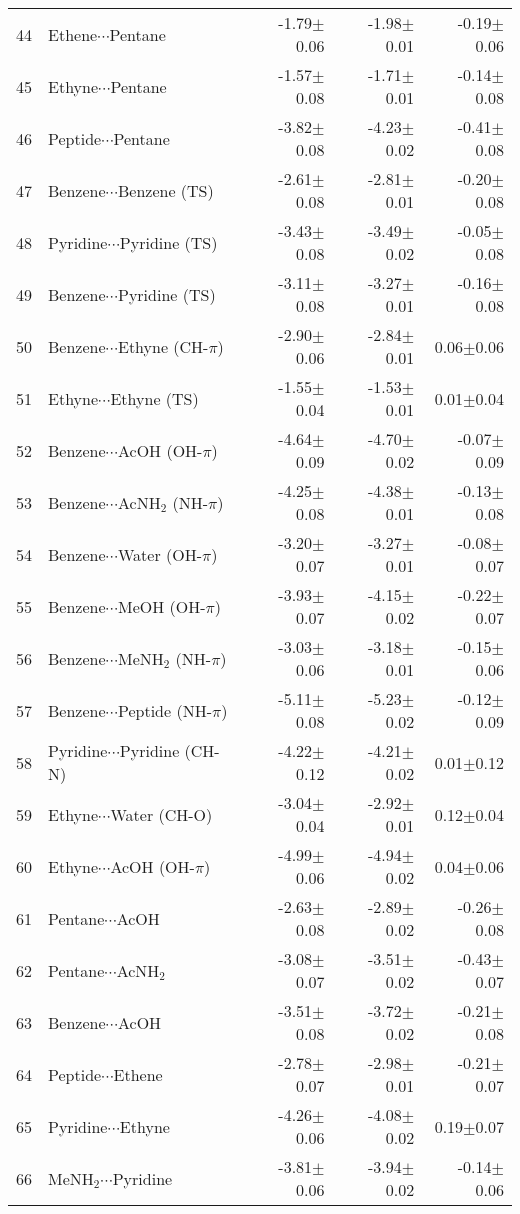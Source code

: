 \begin{longtable}{llrrr}
44 & Ethene$\cdots$Pentane & -1.79$\pm$0.06 & -1.98$\pm$0.01 & -0.19$\pm$0.06  \\
45 & Ethyne$\cdots$Pentane & -1.57$\pm$0.08 & -1.71$\pm$0.01 & -0.14$\pm$0.08  \\
46 & Peptide$\cdots$Pentane & -3.82$\pm$0.08 & -4.23$\pm$0.02 & -0.41$\pm$0.08  \\
47 & Benzene$\cdots$Benzene (TS) & -2.61$\pm$0.08 & -2.81$\pm$0.01 & -0.20$\pm$0.08  \\
48 & Pyridine$\cdots$Pyridine (TS) & -3.43$\pm$0.08 & -3.49$\pm$0.02 & -0.05$\pm$0.08  \\
49 & Benzene$\cdots$Pyridine (TS) & -3.11$\pm$0.08 & -3.27$\pm$0.01 & -0.16$\pm$0.08  \\
50 & Benzene$\cdots$Ethyne (CH-$\pi$) & -2.90$\pm$0.06 & -2.84$\pm$0.01 & 0.06$\pm$0.06  \\
51 & Ethyne$\cdots$Ethyne (TS) & -1.55$\pm$0.04 & -1.53$\pm$0.01 & 0.01$\pm$0.04  \\
52 & Benzene$\cdots$AcOH (OH-$\pi$) & -4.64$\pm$0.09 & -4.70$\pm$0.02 & -0.07$\pm$0.09  \\
53 & Benzene$\cdots$AcNH$_2$ (NH-$\pi$) & -4.25$\pm$0.08 & -4.38$\pm$0.01 & -0.13$\pm$0.08  \\
54 & Benzene$\cdots$Water (OH-$\pi$) & -3.20$\pm$0.07 & -3.27$\pm$0.01 & -0.08$\pm$0.07  \\
55 & Benzene$\cdots$MeOH (OH-$\pi$) & -3.93$\pm$0.07 & -4.15$\pm$0.02 & -0.22$\pm$0.07  \\
56 & Benzene$\cdots$MeNH$_2$ (NH-$\pi$) & -3.03$\pm$0.06 & -3.18$\pm$0.01 & -0.15$\pm$0.06  \\
57 & Benzene$\cdots$Peptide (NH-$\pi$) & -5.11$\pm$0.08 & -5.23$\pm$0.02 & -0.12$\pm$0.09  \\
58 & Pyridine$\cdots$Pyridine (CH-N) & -4.22$\pm$0.12 & -4.21$\pm$0.02 & 0.01$\pm$0.12  \\
59 & Ethyne$\cdots$Water (CH-O) & -3.04$\pm$0.04 & -2.92$\pm$0.01 & 0.12$\pm$0.04  \\
60 & Ethyne$\cdots$AcOH (OH-$\pi$) & -4.99$\pm$0.06 & -4.94$\pm$0.02 & 0.04$\pm$0.06  \\
61 & Pentane$\cdots$AcOH & -2.63$\pm$0.08 & -2.89$\pm$0.02 & -0.26$\pm$0.08  \\
62 & Pentane$\cdots$AcNH$_2$ & -3.08$\pm$0.07 & -3.51$\pm$0.02 & -0.43$\pm$0.07  \\
63 & Benzene$\cdots$AcOH & -3.51$\pm$0.08 & -3.72$\pm$0.02 & -0.21$\pm$0.08  \\
64 & Peptide$\cdots$Ethene & -2.78$\pm$0.07 & -2.98$\pm$0.01 & -0.21$\pm$0.07  \\
65 & Pyridine$\cdots$Ethyne & -4.26$\pm$0.06 & -4.08$\pm$0.02 & 0.19$\pm$0.07  \\
66 & MeNH$_2$$\cdots$Pyridine & -3.81$\pm$0.06 & -3.94$\pm$0.02 & -0.14$\pm$0.06  \\
\end{longtable}\normalsize